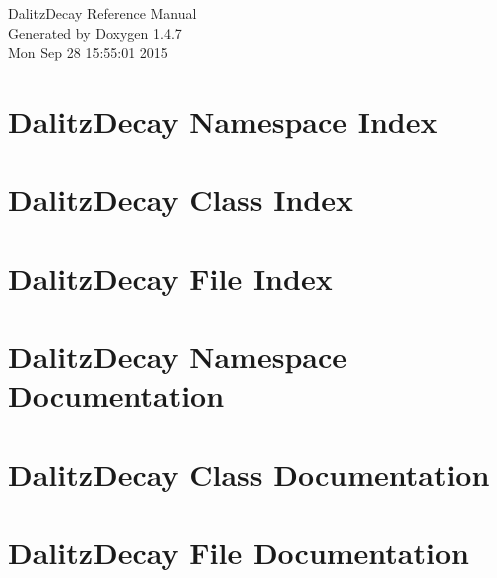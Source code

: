 \documentclass[a4paper]{book}
\begin{document}
\begin{titlepage}
\vspace*{7cm}
\begin{center}
{\Large Dalitz\-Decay Reference Manual}\\
\vspace*{1cm}
{\large Generated by Doxygen 1.4.7}\\
\vspace*{0.5cm}
{\small Mon Sep 28 15:55:01 2015}\\
\end{center}
\end{titlepage}
\clearemptydoublepage
{}
\tableofcontents
\clearemptydoublepage
{}
\chapter{Dalitz\-Decay Namespace Index}

\chapter{Dalitz\-Decay Class Index}

\chapter{Dalitz\-Decay File Index}

\chapter{Dalitz\-Decay Namespace Documentation}


\chapter{Dalitz\-Decay Class Documentation}








\chapter{Dalitz\-Decay File Documentation}








\printindex
\end{document}

